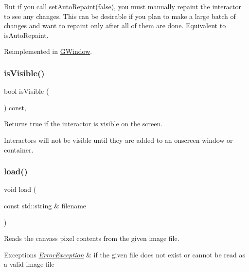 But if you call set\+Auto\+Repaint(false), you must manually repaint the interactor to see any changes. This can be desirable if you plan to make a large batch of changes and want to repaint only after all of them are done. Equivalent to is\+Auto\+Repaint. 

Reimplemented in \mbox{\hyperlink{classGWindow_ae88344ee919d3d3de6e38a8381faf209}{G\+Window}}.

\mbox{\label{classGInteractor_a9d8a6cfb13917785c143e74d40e4e2be}} 
\subsubsection{\texorpdfstring{is\+Visible()}{isVisible()}}
{\footnotesize\ttfamily bool is\+Visible (\begin{DoxyParamCaption}{ }\end{DoxyParamCaption}) const\hspace{0.3cm}{\ttfamily [virtual]}, {\ttfamily [inherited]}}



Returns true if the interactor is visible on the screen. 

Interactors will not be visible until they are added to an onscreen window or container. \mbox{\label{classGCanvas_a6c21edd9d285c925527e3209fca54b01}} 
\subsubsection{\texorpdfstring{load()}{load()}}
{\footnotesize\ttfamily void load (\begin{DoxyParamCaption}\item[{const std\+::string \&}]{filename }\end{DoxyParamCaption})\hspace{0.3cm}{\ttfamily [virtual]}}



Reads the canvas\textquotesingle{}s pixel contents from the given image file. 


\begin{DoxyExceptions}{Exceptions}
{\em \mbox{\hyperlink{classErrorException}{Error\+Exception}}} & if the given file does not exist or cannot be read as a valid image file \\
\hline
\end{DoxyExceptions}
\mbox{\label{classGCanvas_a49dc57a2ce4caa354a5fff6acdde2e7d}} 
